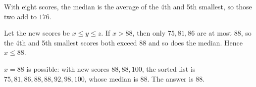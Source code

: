 With eight scores, the median is the average of the 4th and 5th smallest, so those two add to $176$.

Let the new scores be $x\le y\le z$. If $x>88$, then only $75,81,86$ are at most $88$, so the 4th and 5th smallest scores both exceed $88$ and so does the median. Hence $x\le88$.

$x=88$ is possible: with new scores $88,88,100$, the sorted list is $75,81,86,88,88,92,98,100$, whose median is $88$. The answer is $\boxed{88}$.
